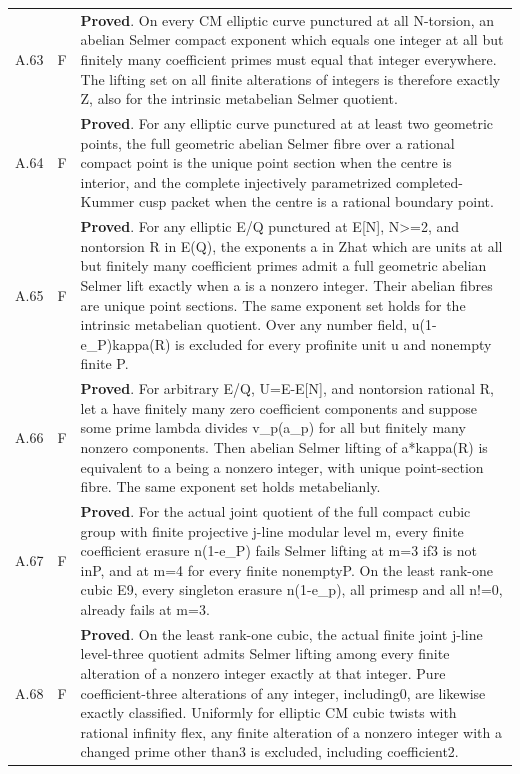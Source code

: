 \begin{longtable}{@{}p{}p{}p{}@{}}
A.63 & F & \textbf{Proved}. On every CM elliptic curve punctured at all N-torsion, an abelian Selmer compact exponent which equals one integer at all but finitely many coefficient primes must equal that integer everywhere. The lifting set on all finite alterations of integers is therefore exactly Z, also for the intrinsic metabelian Selmer quotient. \\
A.64 & F & \textbf{Proved}. For any elliptic curve punctured at at least two geometric points, the full geometric abelian Selmer fibre over a rational compact point is the unique point section when the centre is interior, and the complete injectively parametrized completed-Kummer cusp packet when the centre is a rational boundary point. \\
A.65 & F & \textbf{Proved}. For any elliptic E/Q punctured at E[N], N\textgreater{}=2, and nontorsion R in E(Q), the exponents a in Zhat which are units at all but finitely many coefficient primes admit a full geometric abelian Selmer lift exactly when a is a nonzero integer. Their abelian fibres are unique point sections. The same exponent set holds for the intrinsic metabelian quotient. Over any number field, u(1-e\_P)kappa(R) is excluded for every profinite unit u and nonempty finite P. \\
A.66 & F & \textbf{Proved}. For arbitrary E/Q, U=E-E[N], and nontorsion rational R, let a have finitely many zero coefficient components and suppose some prime lambda divides v\_p(a\_p) for all but finitely many nonzero components. Then abelian Selmer lifting of a*kappa(R) is equivalent to a being a nonzero integer, with unique point-section fibre. The same exponent set holds metabelianly. \\
A.67 & F & \textbf{Proved}. For the actual joint quotient of the full compact cubic group with finite projective j-line modular level m, every finite coefficient erasure n(1-e\_P) fails Selmer lifting at m=3 if3 is not inP, and at m=4 for every finite nonemptyP. On the least rank-one cubic E9, every singleton erasure n(1-e\_p), all primesp and all n!=0, already fails at m=3. \\
A.68 & F & \textbf{Proved}. On the least rank-one cubic, the actual finite joint j-line level-three quotient admits Selmer lifting among every finite alteration of a nonzero integer exactly at that integer. Pure coefficient-three alterations of any integer, including0, are likewise exactly classified. Uniformly for elliptic CM cubic twists with rational infinity flex, any finite alteration of a nonzero integer with a changed prime other than3 is excluded, including coefficient2. \\

\end{longtable}
